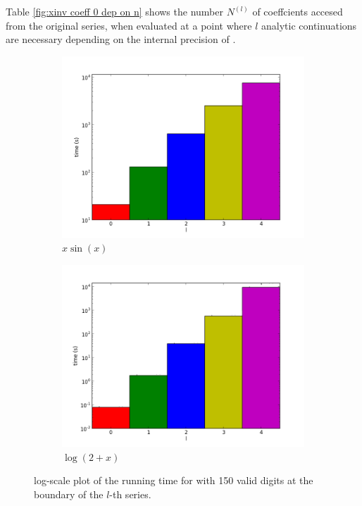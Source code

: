 		Table \ref{fig:xinv coeff 0 dep on n} shows the number $N^{(l)}$ of coeffcients accesed from the original series, when evaluated at a point where $l$ analytic continuations are necessary depending on 
		the internal precision of \irram.

		\begin{figure}[h]
			\centering
			\begin{subfigure}{.45\textwidth}
				\includegraphics[width=1.0\textwidth]{img/analytic/sin_for_n_prec_150_dep_on_series_log.png}
				\caption{$x\sin(x)$}
			\end{subfigure}
			\begin{subfigure}{.45\textwidth}
				\includegraphics[width=1.0\textwidth]{img/analytic/log_for_n_prec_150_dep_on_series_log.png}
				\caption{$\log(2+x)$}
			\end{subfigure}
			\caption{log-scale plot of the running time for \anarect with 150 valid digits at the boundary of the $l$-th series.}
			\label{fig:baana dep on series}
		\end{figure}

